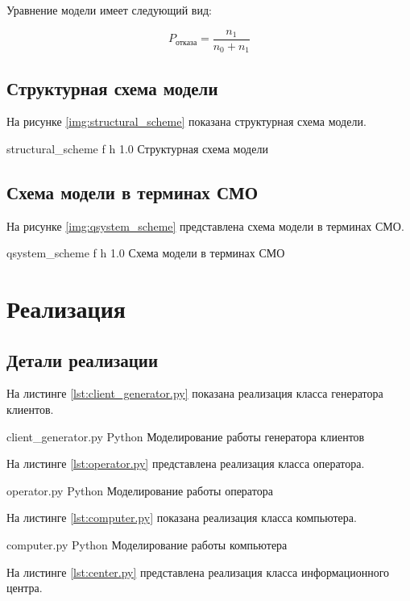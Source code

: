 Уравнение модели имеет следующий вид:

\begin{equation}
    P_{\text{отказа}} = \frac{n_{1}}{n_{0} + n_{1}}
\end{equation}

\section{Структурная схема модели}

На рисунке \ref{img:structural_scheme} показана структурная схема модели.

    {structural_scheme}
    {f}
    {h}
    {1.0\textwidth}
    {Структурная схема модели}

\section{Схема модели в терминах СМО}

На рисунке \ref{img:qsystem_scheme} представлена схема модели в терминах СМО.

    {qsystem_scheme}
    {f}
    {h}
    {1.0\textwidth}
    {Схема модели в терминах СМО}

\chapter{Реализация}

\section{Детали реализации}

На листинге \ref{lst:client_generator.py} показана реализация класса генератора клиентов.

    {client_generator.py}
    {Python}
    {Моделирование работы генератора клиентов}
\newpage

На листинге \ref{lst:operator.py} представлена реализация класса оператора.

    {operator.py}
    {Python}
    {Моделирование работы оператора}
    
На листинге \ref{lst:computer.py} показана реализация класса компьютера.

    {computer.py}
    {Python}
    {Моделирование работы компьютера}

На листинге \ref{lst:center.py} представлена реализация класса информационного центра.

